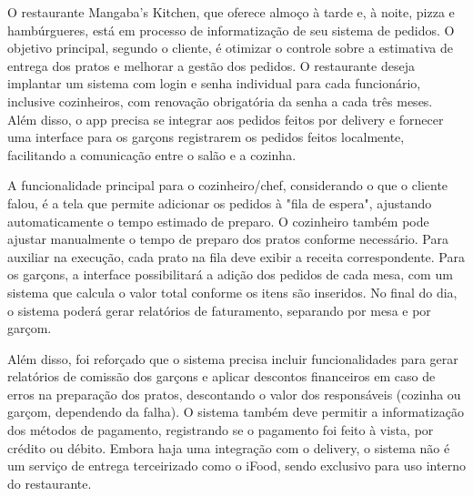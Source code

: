 \hspace{4.5mm}
O restaurante Mangaba's Kitchen, que oferece almoço à tarde e, à noite, pizza e hambúrgueres, está em processo de informatização de seu sistema de pedidos. O objetivo principal, segundo o cliente, é otimizar o controle sobre a estimativa de entrega dos pratos e melhorar a gestão dos pedidos. O restaurante deseja implantar um sistema com login e senha individual para cada funcionário, inclusive cozinheiros, com renovação obrigatória da senha a cada três meses. Além disso, o app precisa se integrar aos pedidos feitos por delivery e fornecer uma interface para os garçons registrarem os pedidos feitos localmente, facilitando a comunicação entre o salão e a cozinha.
\par
A funcionalidade principal para o cozinheiro/chef, considerando o que o cliente falou, é a tela que permite adicionar os pedidos à "fila de espera", ajustando automaticamente o tempo estimado de preparo. O cozinheiro também pode ajustar manualmente o tempo de preparo dos pratos conforme necessário. Para auxiliar na execução, cada prato na fila deve exibir a receita correspondente. Para os garçons, a interface possibilitará a adição dos pedidos de cada mesa, com um sistema que calcula o valor total conforme os itens são inseridos. No final do dia, o sistema poderá gerar relatórios de faturamento, separando por mesa e por garçom.
\par
Além disso, foi reforçado que o sistema precisa incluir funcionalidades para gerar relatórios de comissão dos garçons e aplicar descontos financeiros em caso de erros na preparação dos pratos, descontando o valor dos responsáveis (cozinha ou garçom, dependendo da falha). O sistema também deve permitir a informatização dos métodos de pagamento, registrando se o pagamento foi feito à vista, por crédito ou débito. Embora haja uma integração com o delivery, o sistema não é um serviço de entrega terceirizado como o iFood, sendo exclusivo para uso interno do restaurante.